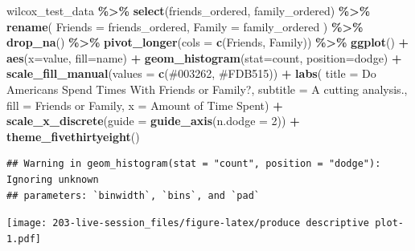 \documentclass[
]{book}
\newenvironment{Shaded}{\begin{snugshade}}{\end{snugshade}}
\newcommand{\AttributeTok}[1]{\textcolor[rgb]{0.13,0.29,0.53}{#1}}
\newcommand{\DecValTok}[1]{\textcolor[rgb]{0.00,0.00,0.81}{#1}}
\newcommand{\FunctionTok}[1]{\textcolor[rgb]{0.13,0.29,0.53}{\textbf{#1}}}
\newcommand{\NormalTok}[1]{#1}
\newcommand{\SpecialCharTok}[1]{\textcolor[rgb]{0.81,0.36,0.00}{\textbf{#1}}}
\newcommand{\StringTok}[1]{\textcolor[rgb]{0.31,0.60,0.02}{#1}}
\theoremstyle{definition}
\theoremstyle{definition}
\theoremstyle{definition}
\theoremstyle{definition}
\theoremstyle{remark}
\begin{document}
\begin{Shaded}
\begin{Highlighting}[]
\NormalTok{wilcox\_test\_data }\SpecialCharTok{\%\textgreater{}\%} 
  \FunctionTok{select}\NormalTok{(friends\_ordered, family\_ordered) }\SpecialCharTok{\%\textgreater{}\%} 
  \FunctionTok{rename}\NormalTok{(}
    \AttributeTok{Friends =}\NormalTok{ friends\_ordered, }
    \AttributeTok{Family  =}\NormalTok{ family\_ordered}
\NormalTok{  ) }\SpecialCharTok{\%\textgreater{}\%} 
  \FunctionTok{drop\_na}\NormalTok{() }\SpecialCharTok{\%\textgreater{}\%} 
  \FunctionTok{pivot\_longer}\NormalTok{(}\AttributeTok{cols =} \FunctionTok{c}\NormalTok{(Friends, Family)) }\SpecialCharTok{\%\textgreater{}\%}   
  \FunctionTok{ggplot}\NormalTok{() }\SpecialCharTok{+} 
    \FunctionTok{aes}\NormalTok{(}\AttributeTok{x=}\NormalTok{value, }\AttributeTok{fill=}\NormalTok{name) }\SpecialCharTok{+} 
    \FunctionTok{geom\_histogram}\NormalTok{(}\AttributeTok{stat=}\StringTok{\textquotesingle{}count\textquotesingle{}}\NormalTok{, }\AttributeTok{position=}\StringTok{\textquotesingle{}dodge\textquotesingle{}}\NormalTok{) }\SpecialCharTok{+} 
  \FunctionTok{scale\_fill\_manual}\NormalTok{(}\AttributeTok{values =} \FunctionTok{c}\NormalTok{(}\StringTok{\textquotesingle{}\#003262\textquotesingle{}}\NormalTok{, }\StringTok{\textquotesingle{}\#FDB515\textquotesingle{}}\NormalTok{)) }\SpecialCharTok{+} 
  \FunctionTok{labs}\NormalTok{(}
    \AttributeTok{title =} \StringTok{\textquotesingle{}Do Americans Spend Times With Friends or Family?\textquotesingle{}}\NormalTok{,}
    \AttributeTok{subtitle =} \StringTok{\textquotesingle{}A cutting analysis.\textquotesingle{}}\NormalTok{, }
    \AttributeTok{fill =} \StringTok{\textquotesingle{}Friends or Family\textquotesingle{}}\NormalTok{, }
    \AttributeTok{x =} \StringTok{\textquotesingle{}Amount of Time Spent\textquotesingle{}}\NormalTok{) }\SpecialCharTok{+} 
  \FunctionTok{scale\_x\_discrete}\NormalTok{(}\AttributeTok{guide =} \FunctionTok{guide\_axis}\NormalTok{(}\AttributeTok{n.dodge =} \DecValTok{2}\NormalTok{)) }\SpecialCharTok{+}
  \FunctionTok{theme\_fivethirtyeight}\NormalTok{()}
\end{Highlighting}
\end{Shaded}

\begin{verbatim}
## Warning in geom_histogram(stat = "count", position = "dodge"): Ignoring unknown
## parameters: `binwidth`, `bins`, and `pad`
\end{verbatim}

\texttt{[image: 203-live-session\_files/figure-latex/produce descriptive plot-1.pdf]}
\end{document}
